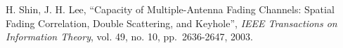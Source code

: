 \documentclass[conference]{IEEEtran}
\begin{document}
\begin{thebibliography}{10}

  H. Shin, J. H. Lee, ``Capacity of Multiple-Antenna Fading Channels: Spatial Fading Correlation, Double Scattering, and Keyhole'',
  \emph{IEEE Transactions on Information Theory}, vol. 49, no. 10, pp.~2636-2647, 2003.





 
\end{thebibliography}
\end{document}

